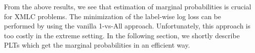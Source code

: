 \documentclass{article}
\renewcommand{\vec}[1]{\boldsymbol{#1}}
\newcommand{\bx}{\vec{x}}
\newcommand{\by}{\vec{y}}
\newcommand{\bw}{\vec{w}}
\newcommand{\calD}{\mathcal{D}}
\newcommand{\calW}{\mathcal{W}}
\newcommand\R{\mathbb{R}}   %
\newcommand{\bc}{\mathbf{c}}
\newcommand{\bd}{\mathbf{d}}
\begin{document}
From the above results, we see that estimation of marginal probabilities is crucial for XMLC problems. The minimization of the label-wise log loss can be performed by using the vanilla 1-vs-All approach. Unfortunately, this approach is too costly in the extreme setting. In the following section, we shortly describe PLTs which get the marginal probabilities in an efficient way. 

%
%
%
%
\end{document}
